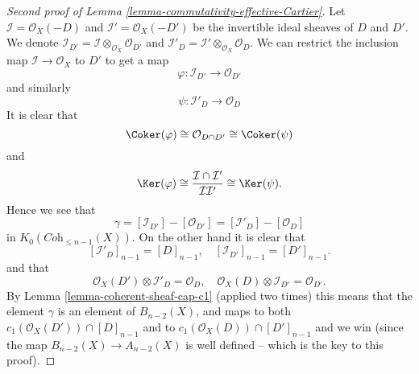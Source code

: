 \begin{proof}[Second proof of Lemma \ref{lemma-commutativity-effective-Cartier}]
Let $\mathcal{I} = \mathcal{O}_X(-D)$ and
$\mathcal{I}' = \mathcal{O}_X(-D')$ be the invertible
ideal sheaves of $D$ and $D'$.
We denote
$\mathcal{I}_{D'} = \mathcal{I} \otimes_{\mathcal{O}_X} \mathcal{O}_{D'}$
and
$\mathcal{I}'_D = \mathcal{I}' \otimes_{\mathcal{O}_X} \mathcal{O}_D$.
We can restrict the inclusion map $\mathcal{I} \to \mathcal{O}_X$
to $D'$ to get a map
$$
\varphi : \mathcal{I}_{D'} \longrightarrow \mathcal{O}_{D'}
$$
and similarly
$$
\psi : \mathcal{I}'_D \longrightarrow \mathcal{O}_D
$$
It is clear that
$$
\Coker(\varphi)
\cong
\mathcal{O}_{D \cap D'}
\cong
\Coker(\psi)
$$
and
$$
\Ker(\varphi)
\cong
\frac{\mathcal{I} \cap \mathcal{I}'}{\mathcal{I}\mathcal{I}'}
\cong
\Ker(\psi).
$$
Hence we see that
$$
\gamma =
[\mathcal{I}_{D'}] - [\mathcal{O}_{D'}]
=
[\mathcal{I}'_D] - [\mathcal{O}_D]
$$
in $K_0(\textit{Coh}_{\leq n - 1}(X))$. On the other hand it is clear that
$$
[\mathcal{I}'_D]_{n - 1} = [D]_{n - 1}, \quad
[\mathcal{I}_{D'}]_{n - 1} = [D']_{n - 1}.
$$
and that
$$
\mathcal{O}_X(D') \otimes \mathcal{I}'_D = \mathcal{O}_D, \quad
\mathcal{O}_X(D) \otimes \mathcal{I}_{D'} = \mathcal{O}_{D'}.
$$
By Lemma \ref{lemma-coherent-sheaf-cap-c1} (applied two times)
this means that the element $\gamma$ is an element of $B_{n - 2}(X)$, and
maps to both $c_1(\mathcal{O}_X(D')) \cap [D]_{n - 1}$ and to
$c_1(\mathcal{O}_X(D)) \cap [D']_{n - 1}$ and we win (since the
map $B_{n - 2}(X) \to A_{n - 2}(X)$ is well defined -- which is
the key to this proof).
\end{proof}



















